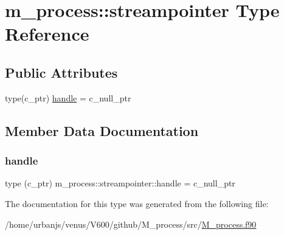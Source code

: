 \hypertarget{structm__process_1_1streampointer}{}\section{m\+\_\+process\+:\+:streampointer Type Reference}
\label{structm__process_1_1streampointer}
\subsection*{Public Attributes}
\begin{DoxyCompactItemize}
\item 
type(c\+\_\+ptr) \mbox{\hyperlink{structm__process_1_1streampointer_aaa577914dd36a5ef61670674dd3a194c}{handle}} = c\+\_\+null\+\_\+ptr
\end{DoxyCompactItemize}


\subsection{Member Data Documentation}
\mbox{\label{structm__process_1_1streampointer_aaa577914dd36a5ef61670674dd3a194c}} 
\subsubsection{\texorpdfstring{handle}{handle}}
{\footnotesize\ttfamily type (c\+\_\+ptr) m\+\_\+process\+::streampointer\+::handle = c\+\_\+null\+\_\+ptr}



The documentation for this type was generated from the following file\+:\begin{DoxyCompactItemize}
\item 
/home/urbanjs/venus/\+V600/github/\+M\+\_\+process/src/\mbox{\hyperlink{M__process_8f90}{M\+\_\+process.\+f90}}\end{DoxyCompactItemize}
